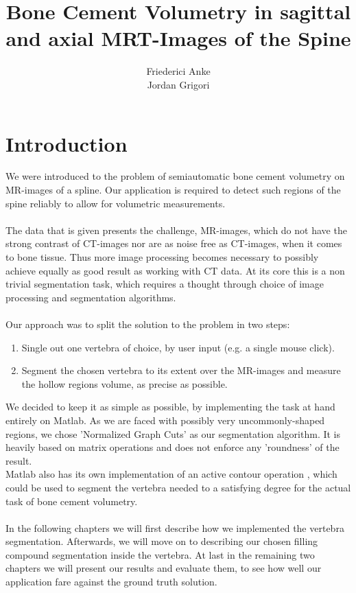 \documentclass{article}
\title{Bone Cement Volumetry in sagittal and axial MRT-Images of the Spine}
\author{Friederici Anke\\ Jordan Grigori}
\begin{document}
  
  \begin{titlepage}
  	\centering
	
  \end{titlepage}
  
  \maketitle
  \thispagestyle{empty}
  \pagebreak
  
  \section{Introduction}
  \setcounter{page}{1}
  {
  	We were introduced to the problem of semiautomatic bone cement volumetry 
  	on MR-images of a spline.
    Our application is required 
  	to detect such regions of the spine reliably to allow for volumetric measurements.\\
  	\\The data that is given presents the challenge, MR-images, which do not have
  	the strong contrast of CT-images nor are as noise free as CT-images, when it
  	comes to bone tissue. Thus more image processing becomes necessary to possibly 
  	achieve equally as good result as working with CT data.
  	At its core this is a non trivial segmentation task, which requires a thought 
  	through choice of image processing and segmentation algorithms.\\
  	\\Our approach was to split the solution to the problem in two steps:
  	\begin{enumerate}
  		\item Single out one vertebra of choice, by user input (e.g. a single mouse click).
  		\item Segment the chosen vertebra to its extent over the MR-images and measure the hollow regions volume, as precise as possible.
  	\end{enumerate}
  	We decided to keep it as simple as possible, by implementing the task at hand 
  	entirely on Matlab. 
    As we are faced with possibly very uncommonly-shaped regions, we chose 'Normalized Graph Cuts' \cite{[ShiMalik00]} as our segmentation algorithm.
    It is heavily based on matrix operations and does not enforce any 'roundness' of the result.
  	\\Matlab also has its own implementation of an active contour
  	operation \cite{[ChanVese01]}, which could be used to segment the vertebra needed to a satisfying degree for the actual task of bone cement volumetry.\\	
  	\\In the following chapters we will first describe how we implemented the vertebra segmentation.
  	Afterwards, we will move on to describing our chosen filling compound segmentation inside the vertebra.
  	At last in the remaining two chapters we will present our results and evaluate them, to see how well our application fare against the ground truth solution.
  }
  \pagebreak
\end{document}
